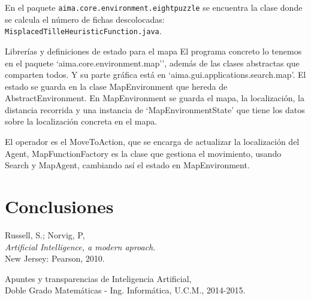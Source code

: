 \documentclass[11pt, a4paper, spanish, openright, twoside]{book}
\begin{document}
En el paquete \texttt{aima.core.environment.eightpuzzle} se encuentra la clase donde se calcula el número de fichas descolocadas: \texttt{MisplacedTilleHeuristicFunction.java}.



\begin{section}{Librerías y definiciones de estado para el mapa }
	El programa concreto lo tenemos en el paquete `aima.core.environment.map'', además de las clases abstractas que comparten todos. Y su parte gráfica está en `aima.gui.applications.search.map'. El estado se guarda en la clase 
	MapEnvironment que hereda de AbstractEnvironment. En MapEnvironment se guarda el mapa, la localización, la distancia recorrida y una instancia de `MapEnvironmentState' que tiene los datos sobre la localización concreta en el mapa.
	
	El operador es el MoveToAction, que se encarga de actualizar la localización del Agent, MapFunctionFactory es la clase que gestiona el movimiento, usando Search y MapAgent, cambiando así el estado en MapEnvironment.

\end{section}

	
\section{Conclusiones}


	
\begin{thebibliography}{9}

	Russell, S.; Norvig, P, \\
	\emph{Artificial Intelligence, a modern aproach}.\\
	New Jersey: Pearson, 2010.
	
	Apuntes y transparencias de Inteligencia Artificial, \\
	Doble Grado Matemáticas - Ing. Informática, U.C.M., 2014-2015.

\end{thebibliography}
\end{document}
